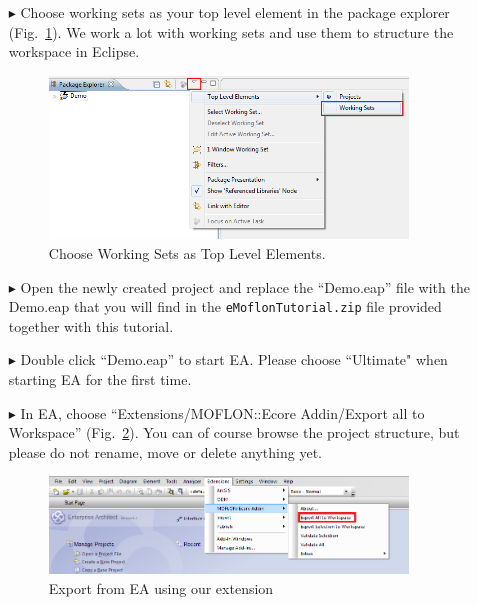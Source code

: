 \begin{enumerate}
\item[$\blacktriangleright$] Choose working sets as your top level element in the package explorer (Fig.~\ref{fig_eclipseWorkingsets}).
We work a lot with working sets and use them to structure the workspace in Eclipse.
\begin{figure}[htbp]
	\centering
  \includegraphics[width=0.9\textwidth]{pics/installationAndSetup/eclipse_workingsets.png}
	\caption{Choose Working Sets as Top Level Elements.}
	\label{fig_eclipseWorkingsets}
\end{figure} 

\item[$\blacktriangleright$] Open the newly created project and replace the ``Demo.eap'' file with the Demo.eap that you will find in the \texttt{eMoflonTutorial.zip} file provided together with this tutorial. 

\item[$\blacktriangleright$] Double click ``Demo.eap'' to start EA.
Please choose ``Ultimate" when starting EA for the first time.

\item[$\blacktriangleright$] In EA, choose ``Extensions/MOFLON::Ecore Addin/Export\- all\- to\- Workspace'' (Fig.~\ref{fig_ea}).
You can of course browse the project structure, but please do not rename, move or delete anything yet.
\begin{figure}[htbp]
	\centering
  \includegraphics[width=0.9\textwidth]{pics/installationAndSetup/ea_firststart}
	\caption{Export from EA using our extension} 
	\label{fig_ea} 
\end{figure}


\end{enumerate}

